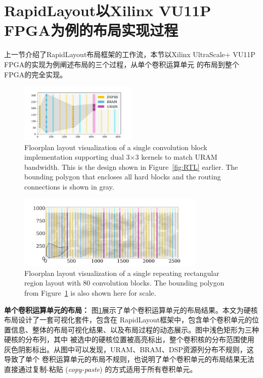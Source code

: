 \section{RapidLayout以Xilinx VU11P FPGA为例的布局实现过程}

上一节介绍了RapidLayout布局框架的工作流，本节以Xilinx UltraScale+ VU11P FPGA的实现为例阐述布局的三个过程，从单个卷积运算单元
的布局到整个FPGA的完全实现。


\begin{figure}
\centering
\includegraphics[width=0.5\textwidth, valign=c]{figure/block1.pdf}
\caption{Floorplan layout visualization of a single convolution block
implementation supporting dual 3$\times$3 kernels to match URAM bandwidth. This
is the design shown in Figure~\ref{fig:RTL} earlier. The
bounding polygon that encloses all hard blocks and the routing connections is
shown in gray.}
\label{fig:block1}	
\end{figure}

\begin{figure}
\centering
\includegraphics[width=0.8\textwidth, valign=c]{figure/block80.pdf}
\caption{Floorplan layout visualization of a single repeating rectangular region
 layout with 80 convolution blocks. The bounding polygon from
Figure~\ref{fig:block1} is also shown here for scale.}
\label{fig:block80}	
\end{figure}


{\bf 单个卷积运算单元的布局：} 图\ref{fig:block1}展示了单个卷积运算单元的布局结果。本文为硬核布局设计了一套可视化套件，包含在
RapidLayout框架中，包含单个卷积单元的位置信息、整体的布局可视化结果、以及布局过程的动态展示。图中浅色矩形为三种硬核的分布列，其中
被选中的硬核位置被高亮标出，整个卷积核的分布范围使用灰色阴影标出。从图中可以发现，URAM、BRAM、DSP资源列分布不规则，这导致了单个
卷积运算单元的布局不规则，也说明了单个卷积单元的布局结果无法直接通过复制-粘贴 (\textit{copy-paste}) 的方式适用于所有卷积单元。

